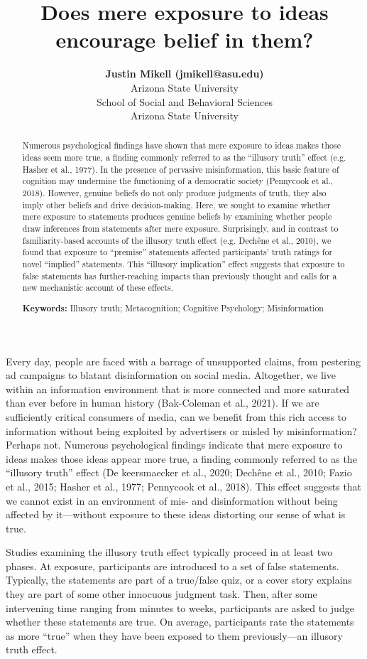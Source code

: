 \documentclass[10pt, letterpaper]{article}
\title{Does mere exposure to ideas encourage belief in them?}
\author{{\large \bf Justin Mikell (jmikell@asu.edu)} \\ Arizona State University \AND {\large \bf Derek Powell (dmpowell@asu.edu)} \\ School of Social and Behavioral Sciences \\ Arizona State University}
\begin{document}
\maketitle

\begin{abstract}
Numerous psychological findings have shown that mere exposure to ideas
makes those ideas seem more true, a finding commonly referred to as the
``illusory truth'' effect (e.g. Hasher et al., 1977). In the presence of
pervasive misinformation, this basic feature of cognition may undermine
the functioning of a democratic society (Pennycook et al., 2018).
However, genuine beliefs do not only produce judgments of truth, they
also imply other beliefs and drive decision-making. Here, we sought to
examine whether mere exposure to statements produces genuine beliefs by
examining whether people draw inferences from statements after mere
exposure. Surprisingly, and in contrast to familiarity-based accounts of
the illusory truth effect (e.g. Dechêne et al., 2010), we found that
exposure to ``premise'' statements affected participants' truth ratings
for novel ``implied'' statements. This ``illusory implication'' effect
suggests that exposure to false statements has further-reaching impacts
than previously thought and calls for a new mechanistic account of these
effects.

\textbf{Keywords:}
Illusory truth; Metacognition; Cognitive Psychology; Misinformation
\end{abstract}

Every day, people are faced with a barrage of unsupported claims, from
pestering ad campaigns to blatant disinformation on social media.
Altogether, we live within an information environment that is more
connected and more saturated than ever before in human history
(Bak-Coleman et al., 2021). If we are sufficiently critical consumers of
media, can we benefit from this rich access to information without being
exploited by advertisers or misled by misinformation? Perhaps not.
Numerous psychological findings indicate that mere exposure to ideas
makes those ideas appear more true, a finding commonly referred to as
the ``illusory truth'' effect (De keersmaecker et al., 2020; Dechêne et
al., 2010; Fazio et al., 2015; Hasher et al., 1977; Pennycook et al.,
2018). This effect suggests that we cannot exist in an environment of
mis- and disinformation without being affected by it---without exposure
to these ideas distorting our sense of what is true.

Studies examining the illusory truth effect typically proceed in at
least two phases. At exposure, participants are introduced to a set of
false statements. Typically, the statements are part of a true/false
quiz, or a cover story explains they are part of some other innocuous
judgment task. Then, after some intervening time ranging from minutes to
weeks, participants are asked to judge whether these statements are
true. On average, participants rate the statements as more ``true'' when
they have been exposed to them previously---an illusory truth effect.
\end{document}
